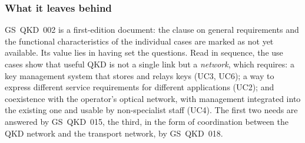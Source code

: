 \subsubsection{What it leaves behind}

GS~QKD~002 is a first-edition document: the clause on general requirements
and the functional characteristics of the individual cases are marked as
not yet available. Its value lies in having set the questions. Read in
sequence, the use cases show that useful QKD is not a single link but a
\emph{network}, which requires: a key management system that stores and
relays keys (UC3, UC6); a way to express different service requirements for
different applications (UC2); and coexistence with the operator's optical
network, with management integrated into the existing one and usable by
non-specialist staff (UC4). The first two needs are answered by GS~QKD~015,
the third, in the form of coordination between the QKD network and the
transport network, by GS~QKD~018.
